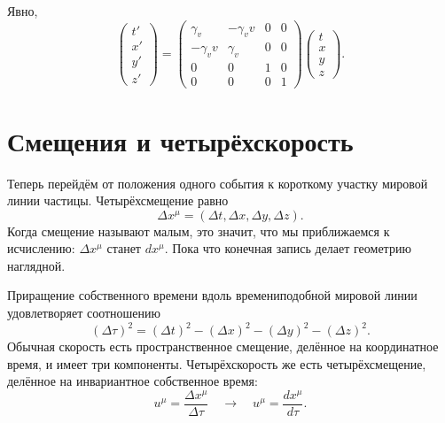 \begin{classroomqa}
\end{classroomqa}

Явно,
\begin{equation}
\begin{pmatrix}
t'\\x'\\y'\\z'
\end{pmatrix}
=
\begin{pmatrix}
\gamma_v&-\gamma_v v&0&0\\
-\gamma_v v&\gamma_v&0&0\\
0&0&1&0\\
0&0&0&1
\end{pmatrix}
\begin{pmatrix}
t\\x\\y\\z
\end{pmatrix}.
\label{eq:sr2-boost-matrix}
\end{equation}

\section{Смещения и четырёхскорость}

Теперь перейдём от положения одного события к короткому участку мировой линии частицы. Четырёхсмещение равно
\begin{equation}
\Delta x^\mu
=(\Delta t,\Delta x,\Delta y,\Delta z).
\end{equation}
Когда смещение называют малым, это значит, что мы приближаемся к исчислению: \(\Delta x^\mu\) станет \(dx^\mu\). Пока что конечная запись делает геометрию наглядной.

Приращение собственного времени вдоль времениподобной мировой линии удовлетворяет соотношению
\begin{equation}
(\Delta\tau)^2
=(\Delta t)^2-(\Delta x)^2-(\Delta y)^2-(\Delta z)^2.
\label{eq:sr2-proper-increment}
\end{equation}
Обычная скорость есть пространственное смещение, делённое на координатное время, и имеет три компоненты. Четырёхскорость же есть четырёхсмещение, делённое на инвариантное собственное время:
\begin{equation}
u^\mu
=\frac{\Delta x^\mu}{\Delta\tau}
\quad\longrightarrow\quad
\boxed{
u^\mu=\frac{dx^\mu}{d\tau}
}.
\label{eq:sr2-four-velocity}
\end{equation}

